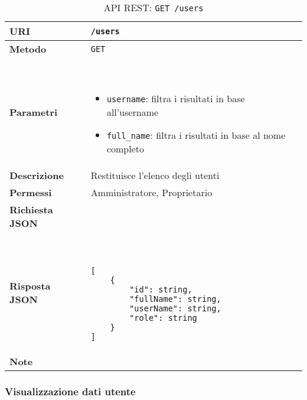         \begin{table}[H]
            \begin{center}
                \begin{tabular}{p{} p{}}
                    \toprule
                    \textbf{URI} & \texttt{/users} \\ \midrule
                    \textbf{Metodo} & \texttt{GET} \\ \midrule
                    \textbf{Parametri} & \
                        \begin{itemize}
                            \item \texttt{username}: filtra i risultati in base all'username
                            \item \texttt{full\_name}: filtra i risultati in base al nome completo
                        \end{itemize} 
                        \\ \midrule
                    \textbf{Descrizione} & Restituisce l'elenco degli utenti \\ \midrule
                    \textbf{Permessi} & Amministratore, Proprietario  \\ \midrule
                    \textbf{Richiesta JSON} & \\ \midrule
                    \textbf{Risposta JSON} & \
                        \begin{lstlisting}[basicstyle={\ttfamily}]
[
    {
        "id": string,
        "fullName": string,
        "userName": string,
        "role": string
    }
]
                        \end{lstlisting}
                        \\ \midrule
                    \textbf{Note} & \\
                    \bottomrule
                \end{tabular}
                \caption{API REST: \texttt{GET /users}}
            \end{center}
        \end{table}

    \subsubsection{Visualizzazione dati utente}


